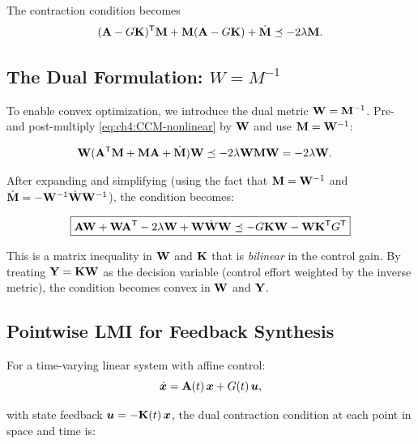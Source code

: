 The contraction condition becomes
\begin{equation}
(\mathbf{A} - G\mathbf{K})^{\mathsf{T}}\mathbf{M} + \mathbf{M}(\mathbf{A} - G\mathbf{K}) + \dot{\mathbf{M}} \preceq -2\lambda\mathbf{M}.
\label{eq:ch4:CCM-nonlinear}
\end{equation}

\subsection{The Dual Formulation: \texorpdfstring{$W = M^{-1}$}{W = M inverse}}

To enable convex optimization, we introduce the dual metric $\mathbf{W} = \mathbf{M}^{-1}$.
Pre- and post-multiply \eqref{eq:ch4:CCM-nonlinear} by $\mathbf{W}$ and use $\mathbf{M} = \mathbf{W}^{-1}$:

\begin{align}
\mathbf{W}(\mathbf{A}^{\mathsf{T}}\mathbf{M} + \mathbf{M}\mathbf{A} + \dot{\mathbf{M}})\mathbf{W} &\preceq -2\lambda\mathbf{W}\mathbf{M}\mathbf{W} = -2\lambda\mathbf{W}.
\end{align}

After expanding and simplifying (using the fact that $\mathbf{M} = \mathbf{W}^{-1}$ and
$\dot{\mathbf{M}} = -\mathbf{W}^{-1}\dot{\mathbf{W}}\mathbf{W}^{-1}$), the condition becomes:

\begin{equation}
\boxed{
\mathbf{A}\mathbf{W} + \mathbf{W}\mathbf{A}^{\mathsf{T}} - 2\lambda\mathbf{W} + \mathbf{W}\dot{\mathbf{W}}\mathbf{W} \preceq -G\mathbf{K}\mathbf{W} - \mathbf{W}\mathbf{K}^{\mathsf{T}} G^{\mathsf{T}}
}
\label{eq:ch4:W-space-LMI}
\end{equation}

This is a matrix inequality in $\mathbf{W}$ and $\mathbf{K}$ that is \emph{bilinear} in the control
gain. By treating $\mathbf{Y} = \mathbf{K}\mathbf{W}$ as the decision variable (control effort weighted
by the inverse metric), the condition becomes convex in $\mathbf{W}$ and $\mathbf{Y}$.

\subsection{Pointwise LMI for Feedback Synthesis}

For a time-varying linear system with affine control:
\begin{equation}
\dot{\bm{x}} = \mathbf{A}(t)\,\bm{x} + G(t)\,\bm{u},
\label{eq:ch4:LTV-system}
\end{equation}

with state feedback $\bm{u} = -\mathbf{K}(t)\,\bm{x}$, the dual contraction condition at each point
in space and time is:

